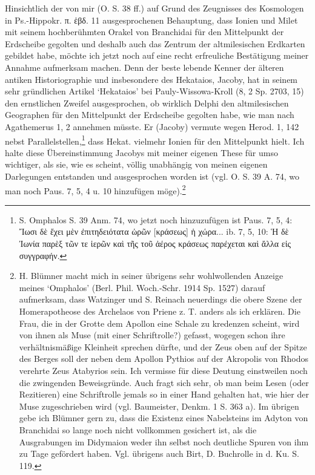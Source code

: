 \documentclass[a4paper, 11pt, oneside]{article}
\begin{document}
Hinsichtlich der von mir (O. S. 38 ff.) auf Grund des Zeugnisses des Kosmologen in Ps.-Hippokr. π. ἑβδ. 11 ausgesprochenen Behauptung, dass Ionien und Milet mit seinem hochberühmten Orakel von Branchidai für den Mittelpunkt der Erdscheibe gegolten und deshalb auch das Zentrum der altmilesischen Erdkarten gebildet habe, möchte ich jetzt noch auf eine recht erfreuliche Bestätigung meiner Annahme aufmerksam machen. Denn der beste lebende Kenner der älteren antiken Historiographie und insbesondere des Hekataios, Jacoby, hat in seinem sehr gründlichen Artikel `Hekataios' bei Pauly-Wissowa-Kroll (8, 2 Sp. 2703, 15) den ernstlichen Zweifel ausgesprochen, ob wirklich Delphi den altmilesischen Geographen für den Mittelpunkt der Erdscheibe gegolten habe, wie man nach Agathemerus 1, 2 annehmen müsste. Er (Jacoby) vermute wegen Herod. 1, 142 nebst Parallelstellen,\footnote{S. Omphalos S. 39 Anm. 74, wo jetzt noch hinzuzufügen ist Paus. 7, 5, 4: Ἴωσι δὲ ἔχει μὲν ἐπιτηδειότατα ὡρῶν [κράσεως] ἡ χώρα... ib. 7, 5, 10: Ἡ δὲ Ἰωνία παρὲξ τῶν τε ἱερῶν καὶ τῆς τοῦ ἀέρος κράσεως παρέχεται καὶ ἄλλα εἰς συγγραφήν.} dass Hekat. vielmehr Ionien für den Mittelpunkt hielt. Ich halte diese Übereinstimmung Jacobys mit meiner eigenen These für umso wichtiger, als sie, wie es scheint, völlig unabhängig von meinen eigenen Darlegungen entstanden und ausgesprochen worden ist (vgl. O. S. 39 A. 74, wo man noch Paus. 7, 5, 4 u. 10 hinzufügen möge).\footnote{H. Blümner macht mich in seiner übrigens sehr wohlwollenden Anzeige meines `Omphalos' (Berl. Phil. Woch.-Schr. 1914 Sp. 1527) darauf aufmerksam, dass Watzinger und S. Reinach neuerdings die obere Szene der Homerapotheose des Archelaos von Priene z. T. anders als ich erklären. Die Frau, die in der Grotte dem Apollon eine Schale zu kredenzen scheint, wird von ihnen als Muse (mit einer Schriftrolle?) gefasst, wogegen schon ihre verhältnismäßige Kleinheit sprechen dürfte, und der Zeus oben auf der Spitze des Berges soll der neben dem Apollon Pythios auf der Akropolis von Rhodos verehrte Zeus Atabyrios sein. Ich vermisse für diese Deutung einstweilen noch die zwingenden Beweisgründe. Auch fragt sich sehr, ob man beim Lesen (oder Rezitieren) eine Schriftrolle jemals so in einer Hand gehalten hat, wie hier der Muse zugeschrieben wird (vgl. Baumeister, Denkm. 1 S. 363 a). Im übrigen gebe ich Blümner gern zu, dass die Existenz eines Nabelsteins im Adyton von Branchidai so lange noch nicht vollkommen gesichert ist, als die Ausgrabungen im Didymaion weder ihn selbst noch deutliche Spuren von ihm zu Tage gefördert haben. Vgl. übrigens auch Birt, D. Buchrolle in d. Ku. S. 119.}
\end{document}
